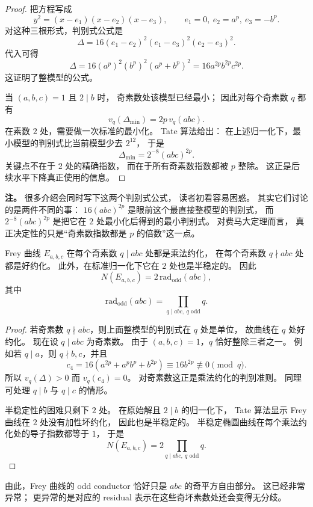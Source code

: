 \begin{proof}
把方程写成
\[
  y^2=(x-e_1)(x-e_2)(x-e_3),
  \qquad e_1=0,\ e_2=a^p,\ e_3=-b^p.
\]
对这种三根形式，判别式公式是
\[
  \Delta=16(e_1-e_2)^2(e_1-e_3)^2(e_2-e_3)^2.
\]
代入可得
\[
  \Delta=16(a^p)^2(b^p)^2(a^p+b^p)^2=16a^{2p}b^{2p}c^{2p}.
\]
这证明了整模型的公式。

当 $(a,b,c)=1$ 且 $2\mid b$ 时，
奇素数处该模型已经最小；
因此对每个奇素数 $q$ 都有
\[
  v_q(\Delta_{\min})=2p\,v_q(abc).
\]
在素数 $2$ 处，需要做一次标准的最小化。
Tate 算法给出：
在上述归一化下，最小模型的判别式比当前模型少去 $2^{12}$，
于是
\[
  \Delta_{\min}=2^{-8}(abc)^{2p}.
\]
关键点不在于 $2$ 处的精确指数，
而在于所有奇素数指数都被 $p$ 整除。
这正是后续水平下降真正使用的信息。
\end{proof}

\textbf{注。}
很多介绍会同时写下这两个判别式公式，
读者初看容易困惑。
其实它们讨论的是两件不同的事：
$16(abc)^{2p}$ 是眼前这个最直接整模型的判别式，
而 $2^{-8}(abc)^{2p}$ 是把它在 $2$ 处最小化后得到的最小判别式。
对费马大定理而言，
真正决定性的只是“奇素数指数都是 $p$ 的倍数”这一点。

\begin{proposition}[半稳定性与导子]
\label{prop:ch10-frey-conductor}
Frey 曲线 $E_{a,b,c}$ 在每个奇素数 $q\mid abc$ 处都是乘法约化，
在每个奇素数 $q\nmid abc$ 处都是好约化。
此外，在标准归一化下它在 $2$ 处也是半稳定的。
因此
\[
  N(E_{a,b,c})=2\,\mathrm{rad}_{\mathrm{odd}}(abc),
\]
其中
\[
  \mathrm{rad}_{\mathrm{odd}}(abc)=\prod_{q\mid abc,\ q\text{ odd}} q.
\]
\end{proposition}

\begin{proof}
若奇素数 $q\nmid abc$，则上面整模型的判别式在 $q$ 处是单位，
故曲线在 $q$ 处好约化。
现在设 $q\mid abc$ 为奇素数。
由于 $(a,b,c)=1$，$q$ 恰好整除三者之一。
例如若 $q\mid a$，则 $q\nmid b,c$，并且
\[
  c_4=16(a^{2p}+a^pb^p+b^{2p})\equiv 16b^{2p}\not\equiv 0\pmod q.
\]
所以 $v_q(\Delta)>0$ 而 $v_q(c_4)=0$。
对奇素数这正是乘法约化的判别准则。
同理可处理 $q\mid b$ 与 $q\mid c$ 的情形。

半稳定性的困难只剩下 $2$ 处。
在原始解且 $2\mid b$ 的归一化下，
Tate 算法显示 Frey 曲线在 $2$ 处没有加性坏约化，
因此也是半稳定的。
半稳定椭圆曲线在每个乘法约化处的导子指数都等于 $1$，
于是
\[
  N(E_{a,b,c})=2\prod_{q\mid abc,\ q\text{ odd}} q.
\]
\end{proof}

由此，Frey 曲线的 odd conductor 恰好只是 $abc$ 的奇平方自由部分。
这已经非常异常；
更异常的是对应的 residual 表示在这些奇坏素数处还会变得无分歧。

